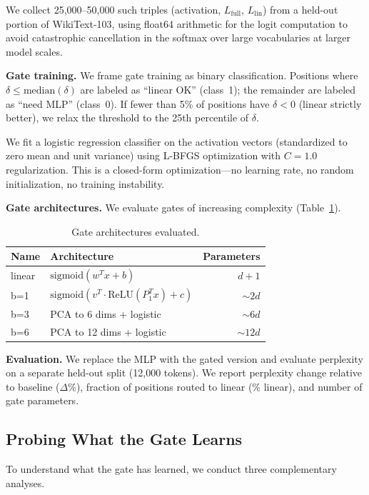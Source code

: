 \documentclass[11pt]{article}
\begin{document}
We collect 25,000--50,000 such triples (activation, $L_{\mathrm{full}}$, $L_{\mathrm{lin}}$) from a held-out portion of WikiText-103, using float64 arithmetic for the logit computation to avoid catastrophic cancellation in the softmax over large vocabularies at larger model scales.

\textbf{Gate training.} We frame gate training as binary classification. Positions where $\delta \leq \mathrm{median}(\delta)$ are labeled as ``linear OK'' (class~1); the remainder are labeled as ``need MLP'' (class~0). If fewer than 5\% of positions have $\delta < 0$ (linear strictly better), we relax the threshold to the 25th percentile of $\delta$.

We fit a logistic regression classifier on the activation vectors (standardized to zero mean and unit variance) using L-BFGS optimization with $C = 1.0$ regularization. This is a closed-form optimization---no learning rate, no random initialization, no training instability.

\textbf{Gate architectures.} We evaluate gates of increasing complexity (Table~\ref{tab:gate-arch}).

\begin{table}[t]
\centering
\caption{Gate architectures evaluated.}
\label{tab:gate-arch}
\begin{tabular}{llr}
\toprule
Name & Architecture & Parameters \\
\midrule
linear & $\mathrm{sigmoid}(w^T x + b)$ & $d + 1$ \\
b=1 & $\mathrm{sigmoid}(v^T \cdot \mathrm{ReLU}(P_1^T x) + c)$ & $\sim 2d$ \\
b=3 & PCA to 6 dims + logistic & $\sim 6d$ \\
b=6 & PCA to 12 dims + logistic & $\sim 12d$ \\
\bottomrule
\end{tabular}
\end{table}

\textbf{Evaluation.} We replace the MLP with the gated version and evaluate perplexity on a separate held-out split (12,000 tokens). We report perplexity change relative to baseline ($\Delta\%$), fraction of positions routed to linear (\% linear), and number of gate parameters.

\subsection{Probing What the Gate Learns}

To understand what the gate has learned, we conduct three complementary analyses.
\end{document}
